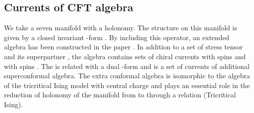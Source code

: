 \documentclass[a4paper,12pt]{article}
\numberwithin{equation}{section}
\providecommand{\Ncal}{{\cal N}}
\providecommand{\G}[1]{\mbox{\myHighlight{$G_{#1}$}\coordHE{}}}
\begin{document}
\subsection{Currents of \G2 CFT algebra}

We take a seven manifold with a \coordHE{} holonomy. The \coordHE{} 
structure on this manifold is given by a closed \coordHE{} 
invariant \coordHE{}-form \myHighlight{$\Phi$}\coordHE{}. 
By including this operator, an extended algebra has been 
constructed in the paper \cite{Shatashvili:1994zw}.
In addition to a set of stress tensor \coordHE{} and its superpartner 
\coordHE{}, 
the algebra contains sets of chiral currents \coordHE{} 
with spins \coordHE{} and \coordHE{} with spins \coordHE{}. 
The \coordHE{} is related with a dual \coordHE{}-form \myHighlight{$\ast\Phi$}\coordHE{} and \coordHE{}
is a set of currents of \myHighlight{$\Ncal=1$}\coordHE{} additional superconformal 
algebra. 
The extra conformal algebra is isomorphic to 
the algebra of the tricritical Ising model with 
central charge \coordHE{} and 
plays an essential role in 
the reduction of holonomy of the manifold from \coordHE{} to \coordHE{} 
through a relation \coordHE{} (Tricritical Ising).
\end{document}
